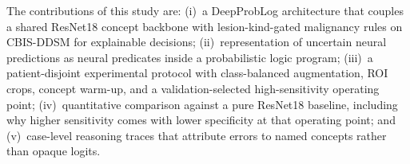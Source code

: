 The contributions of this study are: (i)~a DeepProbLog architecture that couples a shared ResNet18 concept backbone with lesion-kind-gated malignancy rules on CBIS-DDSM for explainable decisions; (ii)~representation of uncertain neural predictions as neural predicates inside a probabilistic logic program; (iii)~a patient-disjoint experimental protocol with class-balanced augmentation, ROI crops, concept warm-up, and a validation-selected high-sensitivity operating point; (iv)~quantitative comparison against a pure ResNet18 baseline, including why higher sensitivity comes with lower specificity at that operating point; and (v)~case-level reasoning traces that attribute errors to named concepts rather than opaque logits.
